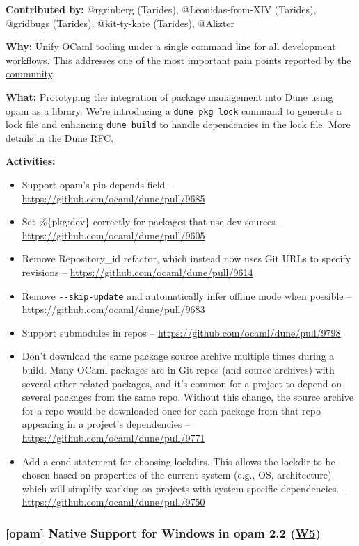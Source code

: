 \documentclass[11pt]{article}
\begin{document}
\textbf{Contributed by:} @rgrinberg (Tarides), @Leonidas-from-XIV (Tarides), @gridbugs (Tarides), @kit-ty-kate (Tarides), @Alizter

\textbf{Why:} Unify OCaml tooling under a single command line for all development workflows. This addresses one of the most important pain
points \href{https://www.dropbox.com/s/omba1d8vhljnrcn/OCaml-user-survey-2020.pdf?dl=0}{reported by the community}.

\textbf{What:} Prototyping the integration of package management into Dune using opam as a library. We're introducing a \texttt{dune pkg lock}
command to generate a lock file and enhancing \texttt{dune build} to handle dependencies in the lock file. More details in the \href{https://github.com/ocaml/dune/issues/7680}{Dune
RFC}.

\textbf{Activities:}
\begin{itemize}
\item Support opam’s pin-depends field -- \url{https://github.com/ocaml/dune/pull/9685}
\item Set \%\{pkg:dev\} correctly for packages that use dev sources -- \url{https://github.com/ocaml/dune/pull/9605}
\item Remove Repository\_id refactor, which instead now uses Git URLs to specify revisions -- \url{https://github.com/ocaml/dune/pull/9614}
\item Remove \texttt{-{}-{}skip-update} and automatically infer offline mode when possible -- \url{https://github.com/ocaml/dune/pull/9683}
\item Support submodules in repos -- \url{https://github.com/ocaml/dune/pull/9798}
\item Don't download the same package source archive multiple times during a build. Many OCaml packages are in Git repos (and source archives) with several other related packages, and it's common for a project to depend on several packages from the same repo. Without this change, the source archive for a repo would be downloaded once for each package from that repo appearing in a project's dependencies -- \url{https://github.com/ocaml/dune/pull/9771}
\item Add a cond statement for choosing lockdirs. This allows the lockdir to be chosen based on properties of the current system (e.g., OS, architecture) which will simplify working on projects with system-specific dependencies. -- \url{https://github.com/ocaml/dune/pull/9750}
\end{itemize}
\subsubsection*{\textbf{{[}opam]} Native Support for Windows in opam 2.2 (\href{https://ocaml.org/docs/platform-roadmap\#w5-manage-dependencies}{W5})}
\label{sec:org59155c9}
\end{document}
